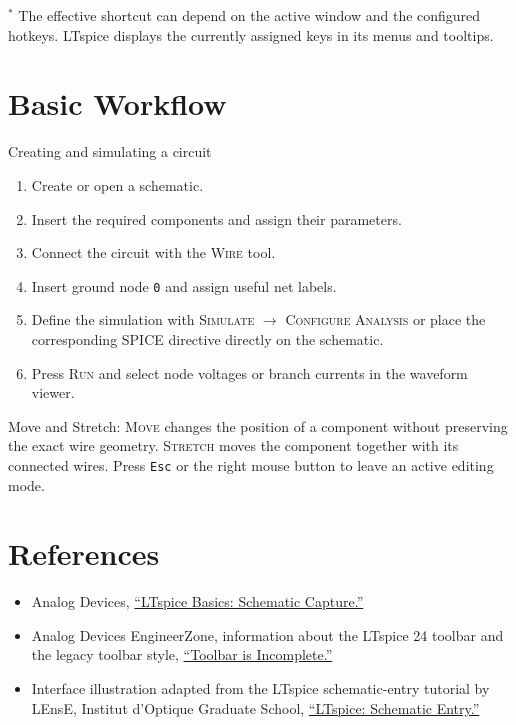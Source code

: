 \normalsize
\medskip
\noindent\footnotesize
$^{*}$ The effective shortcut can depend on the active window and the configured
hotkeys. LTspice displays the currently assigned keys in its menus and tooltips.
\normalsize

\section{Basic Workflow}

\begin{formulaBox}{Creating and simulating a circuit}
\begin{enumerate}
  \item Create or open a schematic.
  \item Insert the required components and assign their parameters.
  \item Connect the circuit with the \textsc{Wire} tool.
  \item Insert ground node \texttt{0} and assign useful net labels.
  \item Define the simulation with
        \textsc{Simulate} $\rightarrow$ \textsc{Configure Analysis} or place the
        corresponding SPICE directive directly on the schematic.
  \item Press \textsc{Run} and select node voltages or branch currents in the
        waveform viewer.
\end{enumerate}
\end{formulaBox}

\begin{noteBox}{Move and Stretch:}
\textsc{Move} changes the position of a component without preserving the exact
wire geometry. \textsc{Stretch} moves the component together with its connected
wires. Press \texttt{Esc} or the right mouse button to leave an active
editing mode.
\end{noteBox}

\section{References}

\begin{itemize}
  \item Analog Devices,
  \href{https://www.analog.com/en/resources/media-center/videos/6368296317112.html}%
  {``LTspice Basics: Schematic Capture.''}
  \item Analog Devices EngineerZone, information about the LTspice 24 toolbar
  and the legacy toolbar style,
  \href{https://ez.analog.com/design-tools-and-calculators/LTspice/f/q-a/581713/tool-bar-is-incomplete}%
  {``Toolbar is Incomplete.''}
  \item Interface illustration adapted from the LTspice schematic-entry
  tutorial by LEnsE, Institut d'Optique Graduate School,
  \href{https://lense.institutoptique.fr/mine/LTspice-saisir-un-schema/}%
  {``LTspice: Schematic Entry.''}
\end{itemize}
